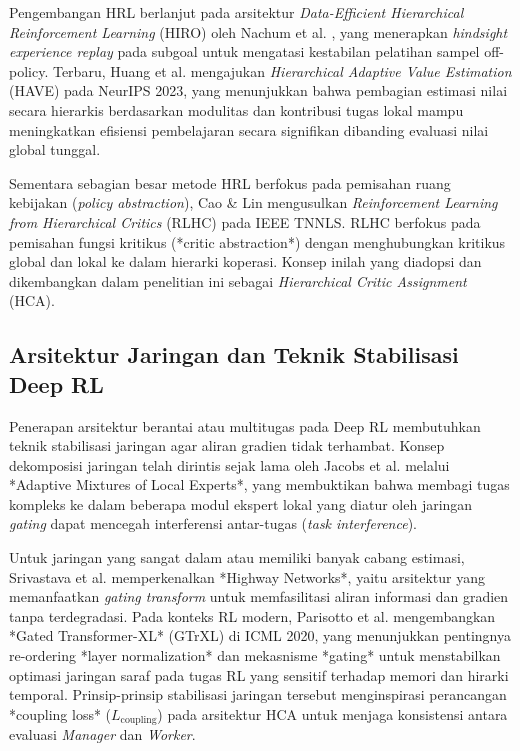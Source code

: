 \documentclass[conference]{IEEEtran}
\begin{document}
Pengembangan HRL berlanjut pada arsitektur \textit{Data-Efficient Hierarchical Reinforcement Learning} (HIRO) oleh Nachum et al. \cite{nachum2018data}, yang menerapkan \textit{hindsight experience replay} pada subgoal untuk mengatasi kestabilan pelatihan sampel off-policy. Terbaru, Huang et al. \cite{huang2023hierarchical} mengajukan \textit{Hierarchical Adaptive Value Estimation} (HAVE) pada NeurIPS 2023, yang menunjukkan bahwa pembagian estimasi nilai secara hierarkis berdasarkan modulitas dan kontribusi tugas lokal mampu meningkatkan efisiensi pembelajaran secara signifikan dibanding evaluasi nilai global tunggal.

Sementara sebagian besar metode HRL berfokus pada pemisahan ruang kebijakan (\textit{policy abstraction}), Cao \& Lin \cite{cao2023reinforcement} mengusulkan \textit{Reinforcement Learning from Hierarchical Critics} (RLHC) pada IEEE TNNLS. RLHC berfokus pada pemisahan fungsi kritikus (*critic abstraction*) dengan menghubungkan kritikus global dan lokal ke dalam hierarki koperasi. Konsep inilah yang diadopsi dan dikembangkan dalam penelitian ini sebagai \textit{Hierarchical Critic Assignment} (HCA).

\subsection{Arsitektur Jaringan dan Teknik Stabilisasi Deep RL}
Penerapan arsitektur berantai atau multitugas pada Deep RL membutuhkan teknik stabilisasi jaringan agar aliran gradien tidak terhambat. Konsep dekomposisi jaringan telah dirintis sejak lama oleh Jacobs et al. \cite{jacobs1991adaptive} melalui *Adaptive Mixtures of Local Experts*, yang membuktikan bahwa membagi tugas kompleks ke dalam beberapa modul ekspert lokal yang diatur oleh jaringan \textit{gating} dapat mencegah interferensi antar-tugas (\textit{task interference}).

Untuk jaringan yang sangat dalam atau memiliki banyak cabang estimasi, Srivastava et al. \cite{srivastava2015training} memperkenalkan *Highway Networks*, yaitu arsitektur yang memanfaatkan \textit{gating transform} untuk memfasilitasi aliran informasi dan gradien tanpa terdegradasi. Pada konteks RL modern, Parisotto et al. \cite{parisotto2020stabilizing} mengembangkan *Gated Transformer-XL* (GTrXL) di ICML 2020, yang menunjukkan pentingnya re-ordering *layer normalization* dan mekasnisme *gating* untuk menstabilkan optimasi jaringan saraf pada tugas RL yang sensitif terhadap memori dan hirarki temporal. Prinsip-prinsip stabilisasi jaringan tersebut menginspirasi perancangan *coupling loss* (\(L_{\text{coupling}}\)) pada arsitektur HCA untuk menjaga konsistensi antara evaluasi \textit{Manager} dan \textit{Worker}.
\end{document}
